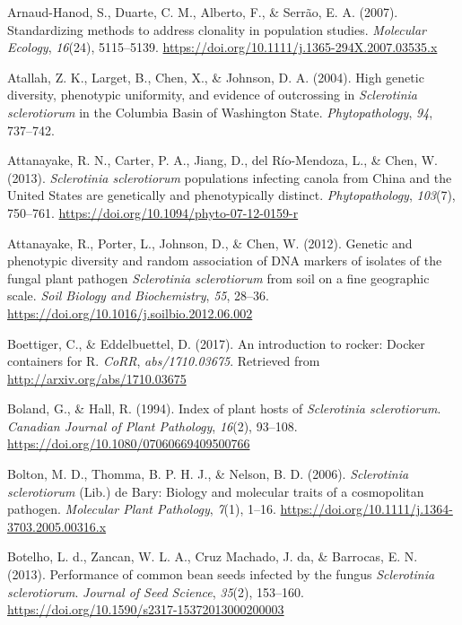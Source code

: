 \documentclass[fleqn,10pt,lineno]{wlpeerj} %
\theoremstyle{definition}
\theoremstyle{definition}
\theoremstyle{definition}
\theoremstyle{remark}
\begin{document}
\hypertarget{ref-arnaud2007standardizing}{}
Arnaud-Hanod, S., Duarte, C. M., Alberto, F., \& Serrão, E. A. (2007).
Standardizing methods to address clonality in population studies.
\emph{Molecular Ecology}, \emph{16}(24), 5115--5139.
\url{https://doi.org/10.1111/j.1365-294X.2007.03535.x}

\hypertarget{ref-atallah2004high}{}
Atallah, Z. K., Larget, B., Chen, X., \& Johnson, D. A. (2004). High
genetic diversity, phenotypic uniformity, and evidence of outcrossing in
\emph{Sclerotinia sclerotiorum} in the Columbia Basin of Washington
State. \emph{Phytopathology}, \emph{94}, 737--742.

\hypertarget{ref-attanayake2013sclerotinia}{}
Attanayake, R. N., Carter, P. A., Jiang, D., del Río-Mendoza, L., \&
Chen, W. (2013). \emph{Sclerotinia sclerotiorum} populations infecting
canola from China and the United States are genetically and
phenotypically distinct. \emph{Phytopathology}, \emph{103}(7), 750--761.
\url{https://doi.org/10.1094/phyto-07-12-0159-r}

\hypertarget{ref-attanayake2012genetic}{}
Attanayake, R., Porter, L., Johnson, D., \& Chen, W. (2012). Genetic and
phenotypic diversity and random association of DNA markers of isolates
of the fungal plant pathogen \emph{Sclerotinia sclerotiorum} from soil
on a fine geographic scale. \emph{Soil Biology and Biochemistry},
\emph{55}, 28--36. \url{https://doi.org/10.1016/j.soilbio.2012.06.002}

\hypertarget{ref-boettiger2017introduction}{}
Boettiger, C., \& Eddelbuettel, D. (2017). An introduction to rocker:
Docker containers for R. \emph{CoRR}, \emph{abs/1710.03675}. Retrieved
from \url{http://arxiv.org/abs/1710.03675}

\hypertarget{ref-boland1994index}{}
Boland, G., \& Hall, R. (1994). Index of plant hosts of
\emph{Sclerotinia sclerotiorum}. \emph{Canadian Journal of Plant
Pathology}, \emph{16}(2), 93--108.
\url{https://doi.org/10.1080/07060669409500766}

\hypertarget{ref-bolton2006sclerotinia}{}
Bolton, M. D., Thomma, B. P. H. J., \& Nelson, B. D. (2006).
\emph{Sclerotinia sclerotiorum} (Lib.) de Bary: Biology and molecular
traits of a cosmopolitan pathogen. \emph{Molecular Plant Pathology},
\emph{7}(1), 1--16.
\url{https://doi.org/10.1111/j.1364-3703.2005.00316.x}

\hypertarget{ref-botelho2013performance}{}
Botelho, L. d., Zancan, W. L. A., Cruz Machado, J. da, \& Barrocas, E.
N. (2013). Performance of common bean seeds infected by the fungus
\emph{Sclerotinia sclerotiorum}. \emph{Journal of Seed Science},
\emph{35}(2), 153--160.
\url{https://doi.org/10.1590/s2317-15372013000200003}
\end{document}
